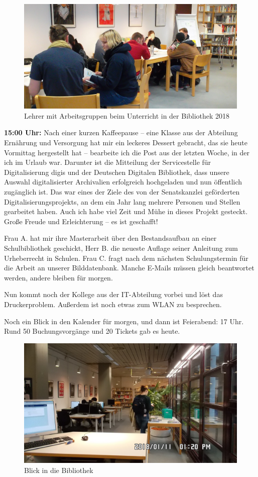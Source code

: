 \documentclass[a4paper,
fontsize=11pt,
oneside,
numbers=noperiodatend,
parskip=half-,
bibliography=totoc,
final
]{scrartcl}
\begin{document}
\begin{figure}
\centering
\includegraphics{img/LV_2018_1.jpg}
\caption{Lehrer mit Arbeitsgruppen beim Unterricht in der Bibliothek
2018}
\end{figure}

\textbf{15:00 Uhr:} Nach einer kurzen Kaffeepause -- eine Klasse aus der
Abteilung Ernährung und Versorgung hat mir ein leckeres Dessert
gebracht, das sie heute Vormittag hergestellt hat -- bearbeite ich die
Post aus der letzten Woche, in der ich im Urlaub war. Darunter ist die
Mitteilung der Servicestelle für Digitalisierung digis und der Deutschen
Digitalen Bibliothek, dass unsere Auswahl digitalisierter Archivalien
erfolgreich hochgeladen und nun öffentlich zugänglich ist. Das war eines
der Ziele des von der Senatskanzlei geförderten
Digitalisierungsprojekts, an dem ein Jahr lang mehrere Personen und
Stellen gearbeitet haben. Auch ich habe viel Zeit und Mühe in dieses
Projekt gesteckt. Große Freude und Erleichterung -- es ist geschafft!

Frau A. hat mir ihre Masterarbeit über den Bestandsaufbau an einer
Schulbibliothek geschickt, Herr B. die neueste Auflage seiner Anleitung
zum Urheberrecht in Schulen. Frau C. fragt nach dem nächsten
Schulungstermin für die Arbeit an unserer Bilddatenbank. Manche E-Mails
müssen gleich beantwortet werden, andere bleiben für morgen.

Nun kommt noch der Kollege aus der IT-Abteilung vorbei und löst das
Druckerproblem. Außerdem ist noch etwas zum WLAN zu besprechen.

Noch ein Blick in den Kalender für morgen, und dann ist Feierabend: 17
Uhr. Rund 50 Buchungsvorgänge und 20 Tickets gab es heute.

\begin{figure}
\centering
\includegraphics{img/SAM_1436.JPG}
\caption{Blick in die Bibliothek}
\end{figure}
\end{document}
